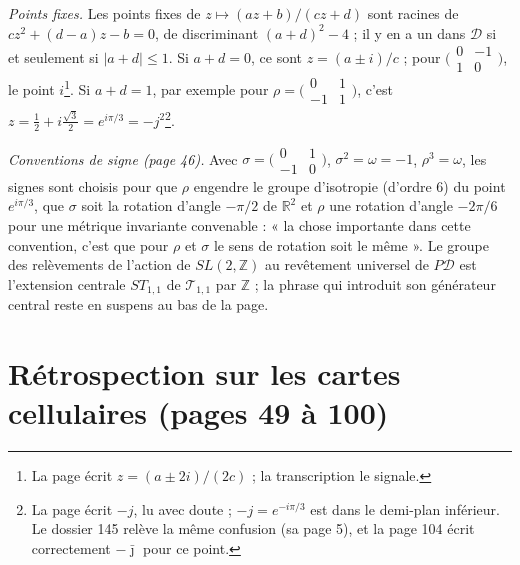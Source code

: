 \documentclass[11pt,a4paper]{article}
\begin{document}
\emph{Points fixes.} Les points fixes de $z \mapsto (az+b)/(cz+d)$ sont racines
de $cz^2 + (d-a)z - b = 0$, de discriminant $(a+d)^2 - 4$ ; il y en a un dans
$\mathcal{D}$ si et seulement si $|a + d| \leq 1$. Si $a + d = 0$, ce sont
$z = (a \pm i)/c$ ; pour $\bigl(\begin{smallmatrix} 0 & -1 \\ 1 & 0 \end{smallmatrix}\bigr)$,
le point $i$\footnote{La page écrit $z = (a \pm 2i)/(2c)$ ; la transcription
le signale.}. Si $a + d = 1$, par exemple pour
$\rho = \bigl(\begin{smallmatrix} 0 & 1 \\ -1 & 1 \end{smallmatrix}\bigr)$, c'est
$z = \tfrac12 + i\tfrac{\sqrt3}{2} = e^{i\pi/3} = -j^2$\footnote{La page écrit
$-j$, lu avec doute ; $-j = e^{-i\pi/3}$ est dans le demi-plan inférieur. Le
dossier 145 relève la même confusion (sa page 5), et la page 104 écrit
correctement $-\bar\jmath$ pour ce point.}.

\emph{Conventions de signe (page 46).} Avec
$\sigma = \bigl(\begin{smallmatrix} 0 & 1 \\ -1 & 0 \end{smallmatrix}\bigr)$,
$\sigma^2 = \omega = -1$, $\rho^3 = \omega$, les signes sont choisis pour que
$\rho$ engendre le groupe d'isotropie (d'ordre $6$) du point $e^{i\pi/3}$, que
$\sigma$ soit la rotation d'angle $-\pi/2$ de $\mathbb{R}^2$ et $\rho$ une
rotation d'angle $-2\pi/6$ pour une métrique invariante convenable : « la
chose importante dans cette convention, c'est que pour $\rho$ et $\sigma$ le
sens de rotation soit le même ». Le groupe des relèvements de l'action de
$SL(2, \mathbb{Z})$ au revêtement universel de $P\mathcal{D}$ est l'extension
centrale $ST_{1,1}$ de $\mathcal{T}_{1,1}$ par $\mathbb{Z}$ ; la phrase qui
introduit son générateur central reste en suspens au bas de la page.

\section*{Rétrospection sur les cartes cellulaires (pages 49 à 100)}
\end{document}
